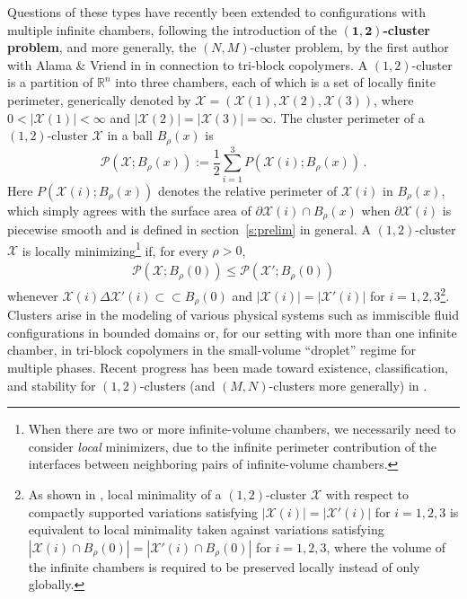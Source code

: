 \documentclass[10pt,reqno]{amsart}
\numberwithin{equation}{section}
\theoremstyle{definition}
\newcommand{\cc}{\subset\!\subset}
\newcommand{\Pcal}{\mathcal{P}}
\newcommand{\Xcal}{\mathcal{X}}
\newcommand{\X}{\mathcal{X}}
\begin{document}
Questions of these types have recently been extended to configurations with multiple infinite chambers, following the introduction of the $\boldsymbol{(1,2)}${\bf -cluster problem}, and more generally, the $(N,M)$-cluster problem,  by the first author with Alama \& Vriend in \cite{AlaBroVri23} in connection to tri-block copolymers. 
A $(1,2)$-cluster is a partition of $\mathbb{R}^n$ into three chambers, each of which is a set of locally finite perimeter, generically denoted by $\mathcal{X}=(\mathcal{X}(1),\mathcal{X}(2),\mathcal{X}(3))$, where $0<|\mathcal{X}(1)|<\infty$ and $|\mathcal{X}(2)|=|\mathcal{X}(3)|=\infty$.
The cluster perimeter of a $(1,2)$-cluster $\X$ in a ball $B_\rho(x)$ is 
\begin{equation}
    \label{eqn: cluster perimeter}
    \Pcal(\X;B_\rho(x)) := \frac{1}{2}\sum_{i=1}^3 P(\X(i); B_\rho(x))\,.
\end{equation}
Here $P(\X(i); B_\rho(x))$ denotes the relative perimeter of $\X(i)$ in $B_\rho(x)$, which simply agrees with the surface area of $\partial \X(i)\cap B_\rho(x)$ when $\partial \X(i)$ is piecewise smooth and is defined in section~\ref{s:prelim} in general.
A $(1,2)$-cluster $\mathcal{X}$ is locally minimizing\footnote{When there are two or more infinite-volume chambers, we necessarily need to consider \emph{local} minimizers, due to the infinite perimeter contribution of the interfaces between neighboring pairs of infinite-volume chambers.} 
if, for every $\rho>0$,
\begin{align}\label{eq:definition of local min}
    \Pcal(\Xcal;B_\rho(0))\leq \Pcal (\Xcal'; B_\rho(0))
\end{align}
whenever $\Xcal(i) \Delta \Xcal'(i) \cc B_\rho(0)$ and $|\Xcal(i)| = |\Xcal'(i)|$ for $i=1,2,3$\footnote{As shown in \cite{BroNov24}, local minimality of a $(1,2)$-cluster $\X$ with respect to compactly supported variations satisfying $|\X(i)| = |\X'(i)|$ for $i=1,2,3$ is equivalent to local minimality taken against variations satisfying $|\X(i) \cap B_\rho(0)| = |\X'(i) \cap B_\rho(0)|$ for $i=1,2,3$, where the volume of the infinite chambers is required to be preserved locally instead of only globally.}. {Clusters arise in the modeling of various physical systems such as immiscible fluid configurations \cites{Whi86,Leo01} in bounded domains or, for our setting with more than one infinite chamber, in  tri-block copolymers \cites{AlaBroLuWan22, AlaBroLuWan25} in the small-volume “droplet” regime for multiple phases.}  {Recent progress has been made toward existence, classification,    and stability for $(1,2)$-clusters (and $(M,N)$-clusters more generally) in \cite{AlaBroVri23,NovPaoTor23, BroNov24,BonaciniCristoferiTopaloglu2025, MilXu25}.}
\end{document}
